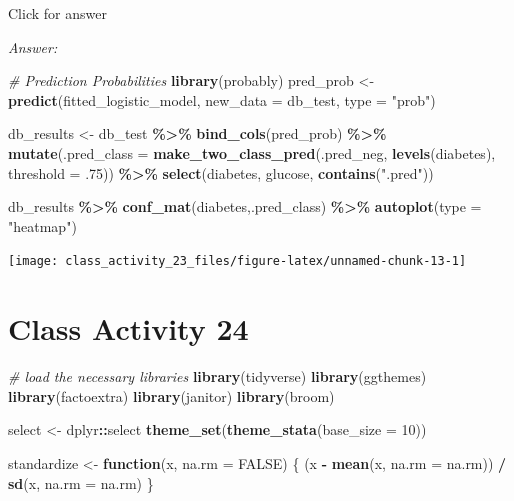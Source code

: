 \documentclass[
]{book}
\newenvironment{Shaded}{\begin{snugshade}}{\end{snugshade}}
\newcommand{\AttributeTok}[1]{\textcolor[rgb]{0.13,0.29,0.53}{#1}}
\newcommand{\CommentTok}[1]{\textcolor[rgb]{0.56,0.35,0.01}{\textit{#1}}}
\newcommand{\ConstantTok}[1]{\textcolor[rgb]{0.56,0.35,0.01}{#1}}
\newcommand{\ControlFlowTok}[1]{\textcolor[rgb]{0.13,0.29,0.53}{\textbf{#1}}}
\newcommand{\DecValTok}[1]{\textcolor[rgb]{0.00,0.00,0.81}{#1}}
\newcommand{\FunctionTok}[1]{\textcolor[rgb]{0.13,0.29,0.53}{\textbf{#1}}}
\newcommand{\NormalTok}[1]{#1}
\newcommand{\OtherTok}[1]{\textcolor[rgb]{0.56,0.35,0.01}{#1}}
\newcommand{\SpecialCharTok}[1]{\textcolor[rgb]{0.81,0.36,0.00}{\textbf{#1}}}
\newcommand{\StringTok}[1]{\textcolor[rgb]{0.31,0.60,0.02}{#1}}
\begin{document}
Click for answer

\emph{Answer:}

\begin{Shaded}
\begin{Highlighting}[]
\CommentTok{\# Prediction Probabilities}
\FunctionTok{library}\NormalTok{(probably)}
\NormalTok{pred\_prob }\OtherTok{\textless{}{-}} \FunctionTok{predict}\NormalTok{(fitted\_logistic\_model,  }\AttributeTok{new\_data =}\NormalTok{ db\_test,   }\AttributeTok{type =} \StringTok{"prob"}\NormalTok{)}

\NormalTok{db\_results }\OtherTok{\textless{}{-}}\NormalTok{ db\_test }\SpecialCharTok{\%\textgreater{}\%} \FunctionTok{bind\_cols}\NormalTok{(pred\_prob) }\SpecialCharTok{\%\textgreater{}\%}
  \FunctionTok{mutate}\NormalTok{(}\AttributeTok{.pred\_class =} \FunctionTok{make\_two\_class\_pred}\NormalTok{(.pred\_neg, }\FunctionTok{levels}\NormalTok{(diabetes), }\AttributeTok{threshold =}\NormalTok{ .}\DecValTok{75}\NormalTok{)) }\SpecialCharTok{\%\textgreater{}\%}
  \FunctionTok{select}\NormalTok{(diabetes, glucose, }\FunctionTok{contains}\NormalTok{(}\StringTok{".pred"}\NormalTok{))}


\NormalTok{db\_results }\SpecialCharTok{\%\textgreater{}\%}  
  \FunctionTok{conf\_mat}\NormalTok{(diabetes,.pred\_class) }\SpecialCharTok{\%\textgreater{}\%} 
  \FunctionTok{autoplot}\NormalTok{(}\AttributeTok{type =} \StringTok{"heatmap"}\NormalTok{)}
\end{Highlighting}
\end{Shaded}

\texttt{[image: class\_activity\_23\_files/figure-latex/unnamed-chunk-13-1]}

\hypertarget{class-activity-24}{%
\chapter{Class Activity 24}\label{class-activity-24}}

\begin{Shaded}
\begin{Highlighting}[]
\CommentTok{\# load the necessary libraries}
\FunctionTok{library}\NormalTok{(tidyverse) }
\FunctionTok{library}\NormalTok{(ggthemes)}
\FunctionTok{library}\NormalTok{(factoextra)}
\FunctionTok{library}\NormalTok{(janitor)}
\FunctionTok{library}\NormalTok{(broom)}

\NormalTok{select }\OtherTok{\textless{}{-}}\NormalTok{ dplyr}\SpecialCharTok{::}\NormalTok{select}
\FunctionTok{theme\_set}\NormalTok{(}\FunctionTok{theme\_stata}\NormalTok{(}\AttributeTok{base\_size =} \DecValTok{10}\NormalTok{))}


\NormalTok{standardize }\OtherTok{\textless{}{-}} \ControlFlowTok{function}\NormalTok{(x, }\AttributeTok{na.rm =} \ConstantTok{FALSE}\NormalTok{) \{}
\NormalTok{  (x }\SpecialCharTok{{-}} \FunctionTok{mean}\NormalTok{(x, }\AttributeTok{na.rm =}\NormalTok{ na.rm)) }\SpecialCharTok{/} \FunctionTok{sd}\NormalTok{(x, }\AttributeTok{na.rm =}\NormalTok{ na.rm)}
\NormalTok{\}}
\end{Highlighting}
\end{Shaded}
\end{document}
